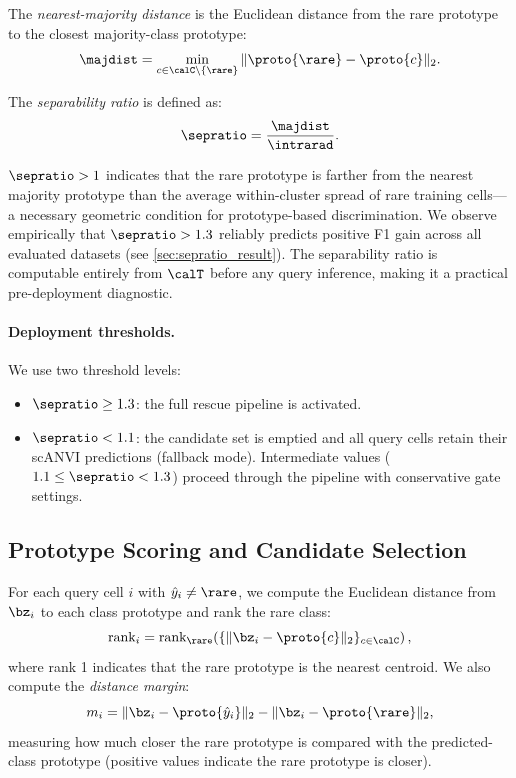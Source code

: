 The \emph{nearest-majority distance} is the Euclidean distance from the rare prototype to the closest majority-class prototype:
\begin{equation}
    \majdist = \min_{c \in \calC \setminus \{\rare\}} \|\proto{\rare} - \proto{c}\|_2.
    \label{eq:majdist}
\end{equation}

The \emph{separability ratio} is defined as:
\begin{equation}
    \sepratio = \frac{\majdist}{\intrarad}.
    \label{eq:sepratio}
\end{equation}

$\sepratio > 1$ indicates that the rare prototype is farther from the nearest majority prototype than the average within-cluster spread of rare training cells---a necessary geometric condition for prototype-based discrimination. We observe empirically that $\sepratio > 1.3$ reliably predicts positive F1 gain across all evaluated datasets (see \cref{sec:sepratio_result}). The separability ratio is computable entirely from $\calT$ before any query inference, making it a practical pre-deployment diagnostic.

\paragraph{Deployment thresholds.} We use two threshold levels:
\begin{itemize}[leftmargin=*]
    \item $\sepratio \geq 1.3$: the full rescue pipeline is activated.
    \item $\sepratio < 1.1$: the candidate set is emptied and all query cells retain their scANVI predictions (fallback mode). Intermediate values ($1.1 \leq \sepratio < 1.3$) proceed through the pipeline with conservative gate settings.
\end{itemize}

\subsection{Prototype Scoring and Candidate Selection}
\label{sec:scoring}

For each query cell $i$ with $\hat{y}_i \neq \rare$, we compute the Euclidean distance from $\bz_i$ to each class prototype and rank the rare class:
\begin{equation}
    \text{rank}_i = \text{rank}_\rare\!\left(\{\|\bz_i - \proto{c}\|_2\}_{c \in \calC}\right),
    \label{eq:rank}
\end{equation}
where rank 1 indicates that the rare prototype is the nearest centroid. We also compute the \emph{distance margin}:
\begin{equation}
    m_i = \|\bz_i - \proto{\hat{y}_i}\|_2 - \|\bz_i - \proto{\rare}\|_2,
    \label{eq:margin}
\end{equation}
measuring how much closer the rare prototype is compared with the predicted-class prototype (positive values indicate the rare prototype is closer).


